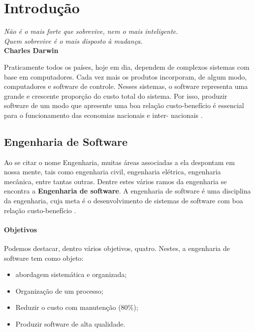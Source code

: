 \setcounter{chapter}{0}
\chapter{Introdução}

\begin{flushright}
	\textit{
		Não é o mais forte que sobrevive, nem o mais inteligente. \\ Quem sobrevive é o mais disposto à mudança.
	} \\
	
	\textbf{Charles Darwin}
\end{flushright}

Praticamente todos os países, hoje em dia, dependem de complexos sistemas com base em computadores. Cada vez mais os produtos incorporam, de algum modo, computadores e software de controle. Nesses sistemas, o software representa uma grande e crescente proporção do custo total do sistema. Por isso, produzir software de um modo que apresente uma boa relação custo-benefício é essencial para o funcionamento das economias nacionais e inter- nacionais \cite{sommerville2003engenharia}.

\section{Engenharia de Software}

Ao se citar o nome Engenharia, muitas áreas associadas a ela despontam em nossa mente, tais como engenharia civil, engenharia elétrica, engenharia mecânica, entre tantas outras. Dentre estes vários ramos da engenharia se encontra a \textbf{Engenharia de software}. A engenharia de software é uma disciplina da engenharia, cuja meta é o desenvolvimento de sistemas de software com boa relação custo-benefício \cite{sommerville2003engenharia}. 

\subsubsection{Objetivos}

Podemos destacar, dentro vários objetivos, quatro. Nestes, a engenharia de software tem como objeto:

\begin{itemize}
	\item abordagem sistemática e organizada;
	\item  Organização de um processo;
	\item Reduzir o custo com manutenção (80\%);
	\item Produzir software de alta qualidade.
\end{itemize}

